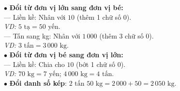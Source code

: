 \documentclass[14pt,a4paper,oneside]{extbook}
\begin{document}
\begin{minipage}[t]{0.49\textwidth}
  \begin{tcolorbox}[
    enhanced,
    title={\footnotesize\bfseries\color{white}\faExchange\ 2. Kĩ thuật chuyển đổi đơn vị},
    colback=teal!2!white,
    colframe=teal!75!black,
    arc=2.5mm, boxrule=0.8pt, top=1.8mm, bottom=1.8mm, left=2mm, right=2mm
  ]
    \footnotesize
    $\bullet$ \textbf{Đổi từ đơn vị lớn sang đơn vị bé:}\\
    --- Liền kề: Nhân với $10$ (thêm 1 chữ số 0).\\
    \textit{VD:} $5\text{ tạ} = 50\text{ yến}$.\\
    --- Tấn sang kg: Nhân với $1\,000$ (thêm 3 chữ số 0).\\
    \textit{VD:} $3\text{ tấn} = 3\,000\text{ kg}$.\\[1mm]
    $\bullet$ \textbf{Đổi từ đơn vị bé sang đơn vị lớn:}\\
    --- Liền kề: Chia cho $10$ (bớt 1 chữ số 0).\\
    \textit{VD:} $70\text{ kg} = 7\text{ yến}$; $4\,000\text{ kg} = 4\text{ tấn}$.\\
    $\bullet$ \textbf{Đổi danh số kép}: $2\text{ tấn } 50\text{ kg} = 2\,000 + 50 = 2\,050\text{ kg}$.
  \end{tcolorbox}
\end{minipage}

\vspace{2mm}
\end{document}
